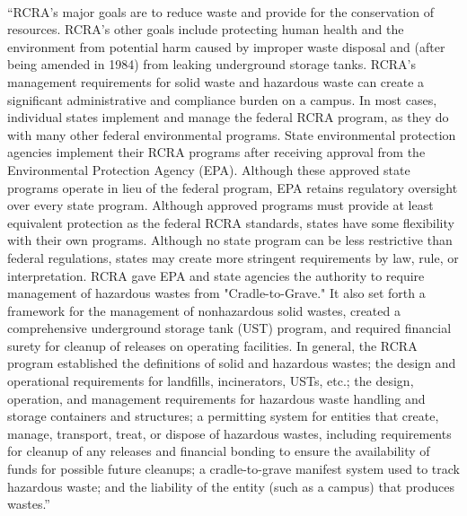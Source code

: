 \documentclass{article}
\begin{document}
\paragraph{}
``RCRA's major goals are to reduce waste and provide for the conservation of resources. RCRA's other goals include protecting human health and the environment from potential harm caused by improper waste disposal and (after being amended in 1984) from leaking underground storage tanks. RCRA's management requirements for solid waste and hazardous waste can create a significant administrative and compliance burden on a campus. In most cases, individual states implement and manage the federal RCRA program, as they do with many other federal environmental programs. State environmental protection agencies implement their RCRA programs after receiving approval from the Environmental Protection Agency (EPA). Although these approved state programs operate in lieu of the federal program, EPA retains regulatory oversight over every state program. Although approved programs must provide at least equivalent protection as the federal RCRA standards, states have some flexibility with their own programs. Although no state program can be less restrictive than federal regulations, states may create more stringent requirements by law, rule, or interpretation. RCRA gave EPA and state agencies the authority to require management of hazardous wastes from "Cradle-to-Grave." It also set forth a framework for the management of nonhazardous solid wastes, created a comprehensive underground storage tank (UST) program, and required financial surety for cleanup of releases on operating facilities. In general, the RCRA program established the definitions of solid and hazardous wastes; the design and operational requirements for landfills, incinerators, USTs, etc.; the design, operation, and management requirements for hazardous waste handling and storage containers and structures; a permitting system for entities that create, manage, transport, treat, or dispose of hazardous wastes, including requirements for cleanup of any releases and financial bonding to ensure the availability of funds for possible future cleanups; a cradle-to-grave manifest system used to track hazardous waste; and the liability of the entity (such as a campus) that produces wastes.”
\end{document}
